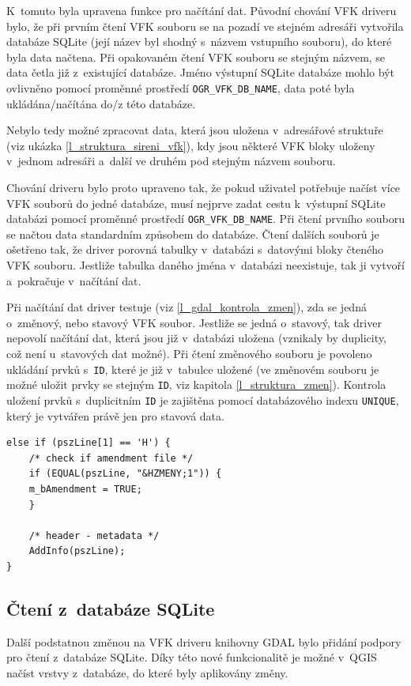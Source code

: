 \documentclass[a4paper,12pt,oneside]{book}
\begin{document}
K~tomuto byla upravena funkce pro načítání dat. Původní chování VFK
driveru bylo, že při prvním čtení VFK souboru se na pozadí ve stejném
adresáři vytvořila databáze SQLite (její název byl shodný s~názvem
vstupního souboru), do které byla data načtena. Při opakovaném čtení
VFK souboru se stejným názvem, se data četla již z~existující
databáze. Jméno výstupní SQLite databáze mohlo být ovlivněno pomocí
proměnné prostředí \texttt{OGR\_VFK\_DB\_NAME}, data poté byla
ukládána/načítána do/z této databáze.

Nebylo tedy možné zpracovat data, která jsou uložena v~adresářové
struktuře (viz ukázka \ref{l_struktura_sireni_vfk}), kdy jsou některé
VFK bloky uloženy v~jednom adresáři a~další ve druhém pod stejným
názvem souboru.

Chování driveru bylo proto upraveno tak, že pokud uživatel potřebuje
načíst více VFK souborů do jedné databáze, musí nejprve zadat cestu
k~výstupní SQLite databázi pomocí proměnné prostředí
\texttt{OGR\_VFK\_DB\_NAME}. Při čtení prvního souboru se načtou data
standardním způsobem do databáze. Čtení dalších souborů je ošetřeno
tak, že driver porovná tabulky v~databázi s~datovými bloky čteného VFK
souboru. Jestliže tabulka daného jména v~databázi neexistuje, tak ji
vytvoří a~pokračuje v~načítání dat.

Při načítání dat driver testuje (viz \ref{l_gdal_kontrola_zmen}), zda
se jedná o~změnový, nebo stavový VFK soubor. Jestliže se jedná
o~stavový, tak driver nepovolí načítání dat, která jsou již v~databázi
uložena (vznikaly by duplicity, což není u~stavových dat možné). Při
čtení změnového souboru je povoleno ukládání prvků s~\texttt{ID},
které je již v~tabulce uložené (ve změnovém souboru je možné uložit
prvky se stejným \texttt{ID}, viz kapitola
\ref{l_struktura_zmen}). Kontrola uložení prvků s~duplicitním
\texttt{ID} je zajištěna pomocí databázového indexu \texttt{UNIQUE},
který je vytvářen právě jen pro stavová data.

\newpage
{\scriptsize
\begin{lstlisting}[style=c++, 
		    caption={Výňatek z~kódu pro kontrolu změnového souboru}, 
		    label=l_gdal_kontrola_zmen]
else if (pszLine[1] == 'H') {
    /* check if amendment file */
    if (EQUAL(pszLine, "&HZMENY;1")) {
	m_bAmendment = TRUE;
    }

    /* header - metadata */
    AddInfo(pszLine);
}
\end{lstlisting}
}

\subsection{Čtení z~databáze SQLite}
Další podstatnou změnou na VFK driveru knihovny GDAL bylo přidání
podpory pro čtení z~databáze SQLite. Díky této nové funkcionalitě je
možné v~QGIS načíst vrstvy z~databáze, do které byly aplikovány změny.
\end{document}
